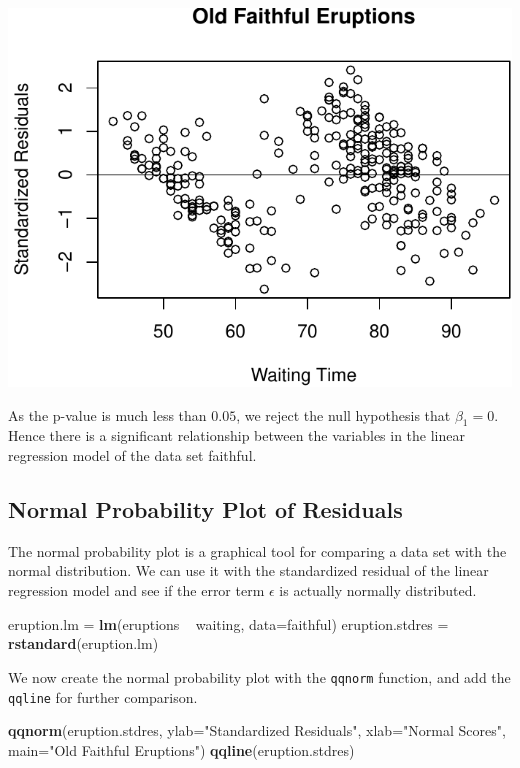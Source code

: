 \documentclass[]{article}
\newenvironment{Shaded}{\begin{snugshade}}{\end{snugshade}}
\newcommand{\KeywordTok}[1]{\textcolor[rgb]{0.13,0.29,0.53}{\textbf{{#1}}}}
\newcommand{\DataTypeTok}[1]{\textcolor[rgb]{0.13,0.29,0.53}{{#1}}}
\newcommand{\StringTok}[1]{\textcolor[rgb]{0.31,0.60,0.02}{{#1}}}
\newcommand{\NormalTok}[1]{{#1}}
\numberwithin{equation}{section}
\begin{document}
\includegraphics{index_files/figure-latex/unnamed-chunk-202-1.pdf}

As the p-value is much less than \(0.05\), we reject the null hypothesis
that \(\beta_1 = 0\). Hence there is a significant relationship between
the variables in the linear regression model of the data set faithful.

\subsection{Normal Probability Plot of
Residuals}\label{normal-probability-plot-of-residuals}

The normal probability plot is a graphical tool for comparing a data set
with the normal distribution. We can use it with the standardized
residual of the linear regression model and see if the error term
\(\epsilon\) is actually normally distributed.

\begin{Shaded}
\begin{Highlighting}[]
\NormalTok{eruption.lm =}\StringTok{ }\KeywordTok{lm}\NormalTok{(eruptions ~}\StringTok{ }\NormalTok{waiting, }\DataTypeTok{data=}\NormalTok{faithful) }
\NormalTok{eruption.stdres =}\StringTok{ }\KeywordTok{rstandard}\NormalTok{(eruption.lm) }
\end{Highlighting}
\end{Shaded}

We now create the normal probability plot with the \texttt{qqnorm}
function, and add the \texttt{qqline} for further comparison.

\begin{Shaded}
\begin{Highlighting}[]
 \KeywordTok{qqnorm}\NormalTok{(eruption.stdres, }
     \DataTypeTok{ylab=}\StringTok{"Standardized Residuals"}\NormalTok{, }
     \DataTypeTok{xlab=}\StringTok{"Normal Scores"}\NormalTok{, }
     \DataTypeTok{main=}\StringTok{"Old Faithful Eruptions"}\NormalTok{) }
 \KeywordTok{qqline}\NormalTok{(eruption.stdres) }
\end{Highlighting}
\end{Shaded}
\end{document}
